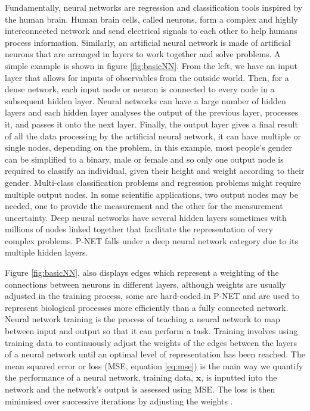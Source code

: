 \documentclass[NOTE, disdraft=true, UKenglish]{\DISCDTLATEXPATH UCLCDTDISdoc}
\begin{document}
Fundamentally, neural networks are regression and classification tools inspired by the human brain. Human brain cells, called neurons, form a complex and highly interconnected network and send electrical signals to each other to help humans process information. Similarly, an artificial neural network is made of artificial neurons that are arranged in layers to work together and solve problems. A simple example is shown in figure \ref{fig:basicNN}. From the left, we have an input layer that allows for inputs of observables from the outside world. Then, for a dense network, each input node or neuron is connected to every node in a subsequent hidden layer. Neural networks can have a large number of hidden layers and each hidden layer analyses the output of the previous layer, processes it, and passes it onto the next layer. Finally, the output layer gives a final result of all the data processing by the artificial neural network, it can have multiple or single nodes, depending on the problem, in this example, most people's gender can be simplified to a binary, male or female and so only one output node is required to classify an individual, given their height and weight according to their gender. Multi-class classification problems and regression problems might require multiple output nodes. In some scientific applications, two output nodes may be needed, one to provide the measurement and the other for the measurement uncertainty. Deep neural networks have several hidden layers sometimes with millions of nodes linked together that facilitate the representation of very complex problems. P-NET falls under a deep neural network category due to its multiple hidden layers. 

Figure \ref{fig:basicNN}, also displays edges which represent a weighting of the connections between neurons in different layers, although weights are usually adjusted in the training process, some are hard-coded in P-NET and are used to represent biological processes more efficiently than a fully connected network. Neural network training is the process of teaching a neural network to map between input and output so that it can perform a task. Training involves using training data to continuously adjust the weights of the edges between the layers of a neural network until an optimal level of representation has been reached. The mean squared error or loss (MSE, equation \ref{eq:mse}) is the main way we quantify the performance of a neural network, training data, $\textbf{x}$, is inputted into the network and the network's output is assessed using MSE. The loss is then minimised over successive iterations by adjusting the weights \cite{noauthor_what_nodate}. 
\end{document}
